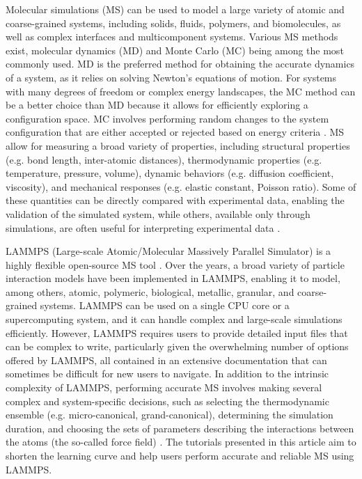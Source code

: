 \documentclass[9pt,tutorial]{livecoms}
\begin{document}

Molecular simulations (MS) can be used to model a large variety of atomic and coarse-grained systems, including solids, fluids, polymers, and biomolecules, as well as complex interfaces and multicomponent systems. Various MS methods exist, molecular dynamics (MD) and Monte Carlo (MC) being among the most commonly used. MD is the preferred method for obtaining the accurate dynamics of a system, as it relies on solving Newton's equations of motion. For systems with many degrees of freedom or complex energy landscapes, the MC method can be a better choice than MD because it allows for efficiently exploring a configuration space. MC involves performing random changes to the system configuration that are either accepted or rejected based on energy criteria \cite{frenkel2023understanding, allen2017computer}. MS allow for measuring a broad variety of properties, including structural properties (e.g. bond length, inter-atomic distances), thermodynamic properties (e.g. temperature, pressure, volume), dynamic behaviors (e.g. diffusion coefficient, viscosity), and mechanical responses (e.g. elastic constant, Poisson ratio). Some of these quantities can be directly compared with experimental data, enabling the validation of the simulated system, while others, available only through simulations, are often useful for interpreting experimental data  \cite{van2008molecular}. 

LAMMPS (Large-scale Atomic/Molecular Massively Parallel Simulator) is a highly flexible open-source MS tool \cite{thompson2022lammps}. Over the years, a broad variety of particle interaction models have been implemented in LAMMPS, enabling it to model, among others, atomic, polymeric, biological, metallic, granular, and coarse-grained systems. LAMMPS can be used on a single CPU core or a supercomputing system, and it can handle complex and large-scale simulations efficiently. However, LAMMPS requires users to provide detailed input files that can be complex to write, particularly given the overwhelming number of options offered by LAMMPS, all contained in an extensive documentation that can sometimes be difficult for new users to navigate. In addition to the intrinsic complexity of LAMMPS, performing accurate MS involves making several complex and system-specific decisions, such as selecting the thermodynamic ensemble (e.g. micro-canonical, grand-canonical), determining the simulation duration, and choosing the sets of parameters describing the interactions between the atoms (the so-called force field) \cite{van2018validation}. The tutorials presented in this article aim to shorten the learning curve and help users perform accurate and reliable MS using LAMMPS.
\end{document}
